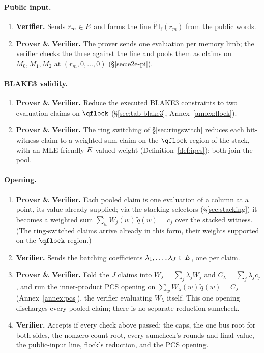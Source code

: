\paragraph{Public input.}
\begin{enumerate}
\item \textbf{Verifier.} Sends $r_m\in E$ and forms the line $\widetilde{\mathrm{PI}}_\ell(r_m)$ from the public words.
\item \textbf{Prover \& Verifier.} The prover sends one evaluation per memory limb; the verifier checks the three against the line and pools them as claims on $M_0,M_1,M_2$ at $(r_m,0,\dots,0)$ (\S\ref{sec:e2e-pi}).
\end{enumerate}

\paragraph{BLAKE3 validity.}
\begin{enumerate}
\item \textbf{Prover \& Verifier.} Reduce the executed BLAKE3 constraints to two evaluation claims on $\qflock$ (\S\ref{sec:tab-blake3}, Annex~\ref{annex:flock}).
\item \textbf{Prover \& Verifier.} The ring switching of \S\ref{sec:ringswitch} reduces each bit-witness claim to a weighted-sum claim on the $\qflock$ region of the stack, with an MLE-friendly $E$-valued weight (Definition~\ref{def:ipcs}); both join the pool.
\end{enumerate}

\paragraph{Opening.}
\begin{enumerate}
\item \textbf{Prover \& Verifier.} Each pooled claim is one evaluation of a column at a point, its value already supplied; via the stacking selectors (\S\ref{sec:stacking}) it becomes a weighted sum $\sum_w W_j(w)\,\widetilde q(w)=c_j$ over the stacked witness. (The ring-switched claims arrive already in this form, their weights supported on the $\qflock$ region.)
\item \textbf{Verifier.} Sends the batching coefficients $\lambda_1,\dots,\lambda_J\in E$, one per claim.
\item \textbf{Prover \& Verifier.} Fold the $J$ claims into $W_\lambda=\sum_j\lambda_j W_j$ and $C_\lambda=\sum_j\lambda_j c_j$, and run the inner-product PCS opening on $\sum_w W_\lambda(w)\,\widetilde q(w)=C_\lambda$ (Annex~\ref{annex:pcs}), the verifier evaluating $W_\lambda$ itself. This one opening discharges every pooled claim; there is no separate reduction sumcheck.
\item \textbf{Verifier.} Accepts if every check above passed: the caps, the one bus root for both sides, the nonzero count root, every sumcheck's rounds and final value, the public-input line, flock's reduction, and the PCS opening.
\end{enumerate}
